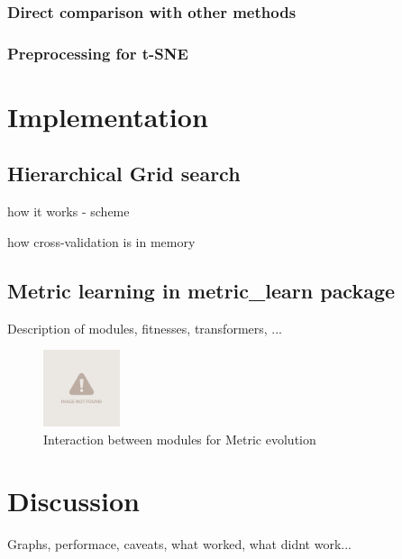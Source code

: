 \documentclass[12pt,a4paper]{report}
\begin{document}
\subsection{Direct comparison with other methods}

\subsection{Preprocessing for t-SNE}


\chapter{Implementation} \label{chap:impl}

\section{Hierarchical Grid search}

how it works - scheme

how cross-validation is in memory

\section{Metric learning in metric\_learn package}

Description of modules, fitnesses, transformers, ...

\begin{figure}[h!] \label{fig:implementation-modules}
	\centering
    \includegraphics[width=0.2\textwidth]{img/notfound}
    \caption{Interaction between modules for Metric evolution}
\end{figure}


\chapter{Discussion}

Graphs, performace, caveats, what worked, what didnt work...
\end{document}
